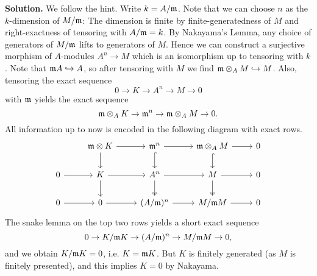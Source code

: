 \documentclass[a4paper,11pt]{article}
\begin{document}
\textbf{Solution.}
We follow the hint. Write $k = A/\mathfrak{m}$. Note that we can choose $n$ as the 
$k$-dimension of $M/\mathfrak{m}$: The dimension is finite by finite-generatedness of $M$ and
right-exactness of tensoring with $A/\mathfrak{m} = k$. By Nakayama's Lemma, any choice of
generators of $M/\mathfrak{m}$ lifts to generators of $M$. Hence we can construct a surjective
morphism of $A$-modules $A^n \to M$ which is an isomorphism up to tensoring
with $k$. Note that $\mathfrak{m} A \hookrightarrow A$, so after tensoring with $M$
we find $\mathfrak{m} \otimes_A M \hookrightarrow M$. Also, tensoring the exact sequence
\begin{equation*}
    0 \to K \to A^n \to M \to 0
\end{equation*}
with $\mathfrak{m}$ yields the exact sequence
\begin{equation*}
    \mathfrak{m} \otimes_A K \to \mathfrak{m}^n \to \mathfrak{m} \otimes_A M \to 0.
\end{equation*}
All information up to now is encoded in the following diagram with exact rows.
\begin{equation*}
\begin{tikzcd}[ampersand replacement=\&]
	\& {\fm \otimes K} \& {\fm^n} \& {\fm \otimes_A M} \& 0 \\
	0 \& K \& {A^n} \& M \& 0 \\
	0 \& 0 \& {(A/\fm)^n} \& {M/\fm M} \& 0
	\arrow[from=3-1, to=3-2]
	\arrow[from=3-2, to=3-3]
	\arrow[from=3-3, to=3-4]
	\arrow[from=3-4, to=3-5]
	\arrow[from=2-1, to=2-2]
	\arrow[from=2-2, to=2-3]
	\arrow[from=2-3, to=2-4]
	\arrow[from=2-4, to=2-5]
	\arrow[hook, from=1-4, to=2-4]
	\arrow[hook, from=1-3, to=2-3]
	\arrow[two heads, from=2-4, to=3-4]
	\arrow[two heads, from=2-3, to=3-3]
	\arrow[from=2-2, to=3-2]
	\arrow[from=1-2, to=2-2]
	\arrow[from=1-2, to=1-3]
	\arrow[from=1-3, to=1-4]
	\arrow[from=1-4, to=1-5]
\end{tikzcd}
\end{equation*}
The snake lemma on the top two rows yields a short exact sequence
$$0 \to K / \mathfrak{m} K \to (A/\mathfrak{m})^n \to M/\mathfrak{m} M \to 0,$$ and we obtain
$K/\mathfrak{m} K = 0$, i.e. $K = \mathfrak{m} K$. But $K$ is finitely generated (as $M$ is finitely
presented), and this implies $K = 0$ by Nakayama. 
\end{document}
